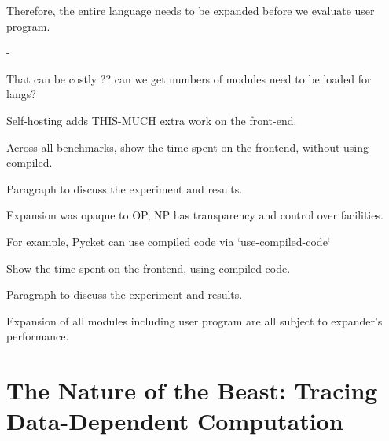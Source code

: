 		\begin{paragraph-here}
			Therefore, the entire language needs to be expanded before we evaluate user program.
		\end{paragraph-here}
-
		\begin{paragraph-here}
			That can be costly ?? can we get numbers of modules need to be loaded for langs?
		\end{paragraph-here}

		\begin{paragraph-here}
			Self-hosting adds THIS-MUCH extra work on the front-end.
		\end{paragraph-here}

		\begin{show-experiment}
			Across all benchmarks, show the time spent on the frontend, without using compiled.
		\end{show-experiment}

		\begin{paragraph-here}
			Paragraph to discuss the experiment and results.
		\end{paragraph-here}

		\begin{paragraph-here}
			Expansion was opaque to OP, NP has transparency and control over facilities.
		\end{paragraph-here}

		\begin{paragraph-here}
			For example, Pycket can use compiled code via `use-compiled-code`
		\end{paragraph-here}

		\begin{show-experiment}
			Show the time spent on the frontend, using compiled code.
		\end{show-experiment}

		\begin{paragraph-here}
			Paragraph to discuss the experiment and results.
		\end{paragraph-here}

		\begin{paragraph-here}
			Expansion of all modules including user program are all subject to expander's performance.
		\end{paragraph-here}

	\section{The Nature of the Beast: Tracing Data-Dependent Computation}
	\label{section:nature-of-the-beast}

